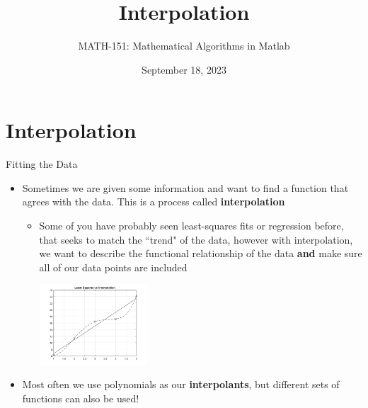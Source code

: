 {}\documentclass[letterpaper,
compress,
xcolor=x11names,
]{beamer}
\begin{document}
	\title{Interpolation}
	\author{MATH-151:  Mathematical Algorithms in Matlab}
	\date[202X]{September 18, 2023}




\begin{frame}
\titlepage
\end{frame}
\section{Interpolation}

\begin{frame}{Fitting the Data}
	\footnotesize
	\begin{itemize}
		\item Sometimes we are given some information and want to find a function that agrees with the data. This is a process called \textbf{interpolation}
		\begin{itemize}
			\item Some of you have probably seen least-squares fits or regression before, that seeks to match the ``trend" of the data, however with interpolation, we want to describe the functional relationship of the data \textbf{and} make sure all of our data points are included
			\begin{center}
				\includegraphics[height = 3cm]{interp_vs_ls.png}
			\end{center}
		\end{itemize}
		\item Most often we use polynomials as our \textbf{interpolants}, but different sets of functions can also be used!
	\end{itemize}
\end{frame}
\end{document}
